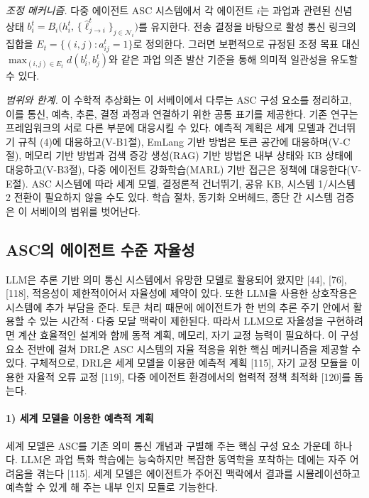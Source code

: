 \textit{조정 메커니즘.}
다중 에이전트 ASC 시스템에서 각 에이전트 $i$는 과업과 관련된 신념 상태 $b_i^t = B_i\bigl(h_i^t,\, \{\hat{\ell}_{j\to i}^t\}_{j\in\mathcal{N}_i}\bigr)$를 유지한다.
전송 결정을 바탕으로 활성 통신 링크의 집합을 $E_t = \{(i,j) : a_{ij}^t = 1\}$로 정의한다.
그러면 보편적으로 규정된 조정 목표 대신 $\max_{(i,j)\in E_t} d(b_i^t, b_j^t)$와 같은 과업 의존 발산 기준을 통해 의미적 일관성을 유도할 수 있다.

\textit{범위와 한계.}
이 수학적 추상화는 이 서베이에서 다루는 ASC 구성 요소를 정리하고, 이를 통신, 예측, 추론, 결정 과정과 연결하기 위한 공통 표기를 제공한다.
기존 연구는 프레임워크의 서로 다른 부분에 대응시킬 수 있다.
예측적 계획은 세계 모델과 건너뛰기 규칙 (4)에 대응하고(V-B1절), EmLang 기반 방법은 토큰 공간에 대응하며(V-C절), 메모리 기반 방법과 검색 증강 생성(RAG) 기반 방법은 내부 상태와 KB 상태에 대응하고(V-B3절), 다중 에이전트 강화학습(MARL) 기반 접근은 정책에 대응한다(V-E절).
ASC 시스템에 따라 세계 모델, 결정론적 건너뛰기, 공유 KB, 시스템 1/시스템 2 전환이 필요하지 않을 수도 있다.
학습 절차, 동기화 오버헤드, 종단 간 시스템 검증은 이 서베이의 범위를 벗어난다.

\subsection{ASC의 에이전트 수준 자율성}

LLM은 추론 기반 의미 통신 시스템에서 유망한 모델로 활용되어 왔지만 [44], [76], [118], 적응성이 제한적이어서 자율성에 제약이 있다.
또한 LLM을 사용한 상호작용은 시스템에 추가 부담을 준다.
토큰 처리 때문에 에이전트가 한 번의 추론 주기 안에서 활용할 수 있는 시간적·다중 모달 맥락이 제한된다.
따라서 LLM으로 자율성을 구현하려면 계산 효율적인 설계와 함께 동적 계획, 메모리, 자기 교정 능력이 필요하다.
이 구성 요소 전반에 걸쳐 DRL은 ASC 시스템의 자율 적응을 위한 핵심 메커니즘을 제공할 수 있다.
구체적으로, DRL은 세계 모델을 이용한 예측적 계획 [115], 자기 교정 모듈을 이용한 자율적 오류 교정 [119], 다중 에이전트 환경에서의 협력적 정책 최적화 [120]를 돕는다.

\paragraph{1) 세계 모델을 이용한 예측적 계획}
세계 모델은 ASC를 기존 의미 통신 개념과 구별해 주는 핵심 구성 요소 가운데 하나다.
LLM은 과업 특화 학습에는 능숙하지만 복잡한 동역학을 포착하는 데에는 자주 어려움을 겪는다 [115].
세계 모델은 에이전트가 주어진 맥락에서 결과를 시뮬레이션하고 예측할 수 있게 해 주는 내부 인지 모듈로 기능한다.

